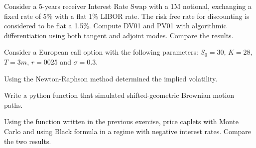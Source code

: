 \documentclass[12pt,a4paper]{book}
\begin{document}
\begin{exercise}[subtitle=AD for a Swap (\texttt{python})]
Consider a 5-years receiver Interest Rate Swap with a 1M notional, exchanging a fixed rate of 5\% with a flat 1\% LIBOR rate. The risk free rate for discounting is considered to be flat a 1.5\%.
Compute DV01 and PV01 with algorithmic differentiation using both tangent and adjoint modes. Compare the results.
\end{exercise}

\begin{exercise}[subtitle=BS Implied Volatility (\texttt{python})]
Consider a European call option with the following parameters: $S_0=30$, $K=28$, $T=3m$, $r=0025$ and $\sigma=0.3$.

Using the Newton-Raphson method determined the implied volatility.
\end{exercise}

\begin{exercise}[subtitle=Shifted Brownian Motion (\texttt{python})]
Write a python function that simulated shifted-geometric Brownian motion paths.
\end{exercise}

\begin{exercise}[subtitle=Negative Rates (\texttt{python})]
Using the function written in the previous exercise, price caplets with Monte Carlo and using Black formula in a regime with negative interest rates. Compare the two results.
\end{exercise}
\end{document}
